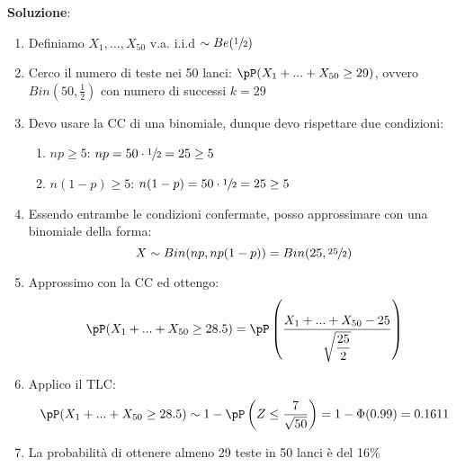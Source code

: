 \ind \textbf{Soluzione}: 
\begin{enumerate}
    \item Definiamo $X_1, ..., X_{50} $ v.a. i.i.d $\sim Be(\sfrac{1}{2})$
    \item Cerco il numero di teste nei 50 lanci: $\pP(X_1 + ... + X_{50} \geq 29) $, ovvero $Bin(50, \frac{1}{2})$ con numero di successi $k=29$
    \item Devo usare la CC di una binomiale, dunque devo rispettare due condizioni:
        \begin{enumerate}
            \item $np \geq 5$: $np=50 \cdot \sfrac{1}{2}= 25 \geq 5$
            \item $n(1-p) \geq 5$: $n(1-p)=50\cdot \sfrac{1}{2}=25 \geq 5$
        \end{enumerate}
    \item Essendo entrambe le condizioni confermate, posso approssimare con una binomiale della forma: $$X \sim Bin(np, np(1-p)) = Bin(25, \sfrac{25}{2})$$
    \item Approssimo con la CC ed ottengo: $$\pP(X_1 + ... + X_{50} \geq 28.5) = \pP \left( \dfrac{X_1 + ... + X_{50} - 25}{\sqrt{\dfrac{25}{2}}} \right)$$
    \item Applico il TLC: $$\pP(X_1 + ... + X_{50} \geq 28.5) \sim 1 - \pP \left(Z \leq \frac{7}{\sqrt{50}} \right) = 1 - \Phi(0.99) = 0.1611$$
    \item La probabilità di ottenere almeno 29 teste in 50 lanci è del 16\%
\end{enumerate}



